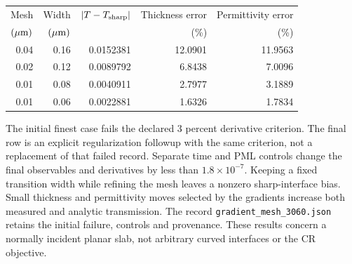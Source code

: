\documentclass[11pt,a4paper]{article}
\begin{document}
\begin{center}
\begin{tabular}{rrrrr}
\toprule
Mesh & Width & $|T-T_{\rm sharp}|$ & Thickness error & Permittivity error\\
$(\mu{\rm m})$ & $(\mu{\rm m})$ & & (\%) & (\%)\\
\midrule
0.04 & 0.16 & 0.0152381 & 12.0901 & 11.9563\\
0.02 & 0.12 & 0.0089792 & 6.8438 & 7.0096\\
0.01 & 0.08 & 0.0040911 & 2.7977 & 3.1889\\
0.01 & 0.06 & 0.0022881 & 1.6326 & 1.7834\\
\bottomrule
\end{tabular}
\end{center}
The initial finest case fails the declared 3 percent derivative criterion.
The final row is an explicit regularization followup with the same criterion,
not a replacement of that failed record. Separate time and PML controls
change the final observables and derivatives by less than $1.8\times10^{-7}$.
Keeping a fixed transition width while refining the mesh leaves a nonzero
sharp-interface bias. Small thickness and permittivity moves selected by
the gradients increase both measured and analytic transmission.
The record \texttt{gradient\_mesh\_3060.json} retains the initial failure,
controls and provenance. These results concern a normally incident planar
slab, not arbitrary curved interfaces or the CR objective.
\end{document}

